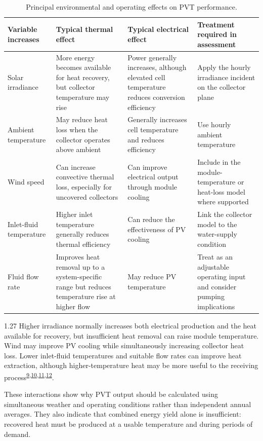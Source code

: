 \documentclass[12pt,letterpaper]{article}
\DeclareRobustCommand{\citenum}[1]{\hyperlink{ref:#1}{#1}} %
\begin{document}
\begin{table}[htbp]
\centering
\renewcommand{\thetable}{1}
\small
\begin{tabular}{@{}>{\raggedright\arraybackslash}p{1.15in}>{\raggedright\arraybackslash}p{1.62in}>{\raggedright\arraybackslash}p{1.62in}>{\raggedright\arraybackslash}p{1.61in}@{}}
\toprule
\textbf{Variable increases} & \textbf{Typical thermal effect} & \textbf{Typical electrical effect} & \textbf{Treatment required in assessment} \\
\midrule
Solar irradiance & More energy becomes available for heat recovery, but collector temperature may rise & Power generally increases, although elevated cell temperature reduces conversion efficiency & Apply the hourly irradiance incident on the collector plane \\
Ambient temperature & May reduce heat loss when the collector operates above ambient & Generally increases cell temperature and reduces efficiency & Use hourly ambient temperature \\
Wind speed & Can increase convective thermal loss, especially for uncovered collectors & Can improve electrical output through module cooling & Include in the module-temperature or heat-loss model where supported \\
Inlet-fluid temperature & Higher inlet temperature generally reduces thermal efficiency & Can reduce the effectiveness of PV cooling & Link the collector model to the water-supply condition \\
Fluid flow rate & Improves heat removal up to a system-specific range but reduces temperature rise at higher flow & May reduce PV temperature & Treat as an adjustable operating input and consider pumping implications \\
\bottomrule
\end{tabular}
\caption{Principal environmental and operating effects on PVT performance.}
\label{tab:pvt-env-effects}
\end{table}

\begin{spacing}{1.27}
Higher irradiance normally increases both electrical production and the heat available for recovery, but insufficient heat removal can raise module temperature. Wind may improve PV cooling while simultaneously increasing collector heat loss. Lower inlet-fluid temperatures and suitable flow rates can improve heat extraction, although higher-temperature heat may be more useful to the receiving process\textsuperscript{\citenum{9},\citenum{10},\citenum{11},\citenum{12}}.\par

\vspace{0.15in}

These interactions show why PVT output should be calculated using simultaneous weather and operating conditions rather than independent annual averages. They also indicate that combined energy yield alone is insufficient: recovered heat must be produced at a usable temperature and during periods of demand.\par
\end{spacing}
\end{document}

